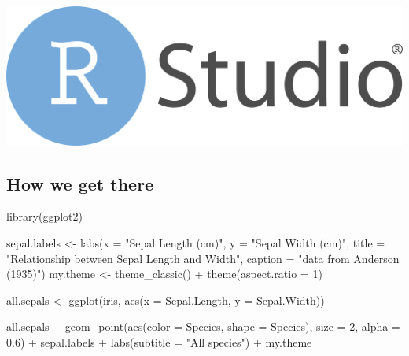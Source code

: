 \documentclass[
  letterpaper,
  DIV=11,
  numbers=noendperiod]{scrartcl}
\newenvironment{Shaded}{\begin{snugshade}}{\end{snugshade}}
\newcommand{\AttributeTok}[1]{\textcolor[rgb]{0.40,0.45,0.13}{#1}}
\newcommand{\DecValTok}[1]{\textcolor[rgb]{0.68,0.00,0.00}{#1}}
\newcommand{\FloatTok}[1]{\textcolor[rgb]{0.68,0.00,0.00}{#1}}
\newcommand{\FunctionTok}[1]{\textcolor[rgb]{0.28,0.35,0.67}{#1}}
\newcommand{\NormalTok}[1]{\textcolor[rgb]{0.00,0.23,0.31}{#1}}
\newcommand{\OtherTok}[1]{\textcolor[rgb]{0.00,0.23,0.31}{#1}}
\newcommand{\SpecialCharTok}[1]{\textcolor[rgb]{0.37,0.37,0.37}{#1}}
\newcommand{\StringTok}[1]{\textcolor[rgb]{0.13,0.47,0.30}{#1}}
\begin{document}
\includegraphics{InClassStatic/RStudio-Logo-Flat.png}

\hypertarget{how-we-get-there-1}{%
\subsection{How we get there}\label{how-we-get-there-1}}

\begin{Shaded}
\begin{Highlighting}[]
\FunctionTok{library}\NormalTok{(ggplot2)}


\NormalTok{sepal.labels }\OtherTok{\textless{}{-}} \FunctionTok{labs}\NormalTok{(}\AttributeTok{x =} \StringTok{"Sepal Length (cm)"}\NormalTok{, }\AttributeTok{y =} \StringTok{"Sepal Width (cm)"}\NormalTok{,}
                     \AttributeTok{title =} \StringTok{"Relationship between Sepal Length and Width"}\NormalTok{,}
                     \AttributeTok{caption =} \StringTok{"data from Anderson (1935)"}\NormalTok{)}
\NormalTok{my.theme }\OtherTok{\textless{}{-}} \FunctionTok{theme\_classic}\NormalTok{()  }\SpecialCharTok{+} \FunctionTok{theme}\NormalTok{(}\AttributeTok{aspect.ratio =} \DecValTok{1}\NormalTok{)}

\NormalTok{all.sepals }\OtherTok{\textless{}{-}} \FunctionTok{ggplot}\NormalTok{(iris, }\FunctionTok{aes}\NormalTok{(}\AttributeTok{x =}\NormalTok{ Sepal.Length, }\AttributeTok{y =}\NormalTok{ Sepal.Width))}

\NormalTok{all.sepals }\SpecialCharTok{+} 
  \FunctionTok{geom\_point}\NormalTok{(}\FunctionTok{aes}\NormalTok{(}\AttributeTok{color =}\NormalTok{ Species, }\AttributeTok{shape =}\NormalTok{ Species), }\AttributeTok{size =} \DecValTok{2}\NormalTok{, }\AttributeTok{alpha =} \FloatTok{0.6}\NormalTok{) }\SpecialCharTok{+}
\NormalTok{  sepal.labels }\SpecialCharTok{+} \FunctionTok{labs}\NormalTok{(}\AttributeTok{subtitle =} \StringTok{"All species"}\NormalTok{) }\SpecialCharTok{+}
\NormalTok{  my.theme}
\end{Highlighting}
\end{Shaded}
\end{document}
